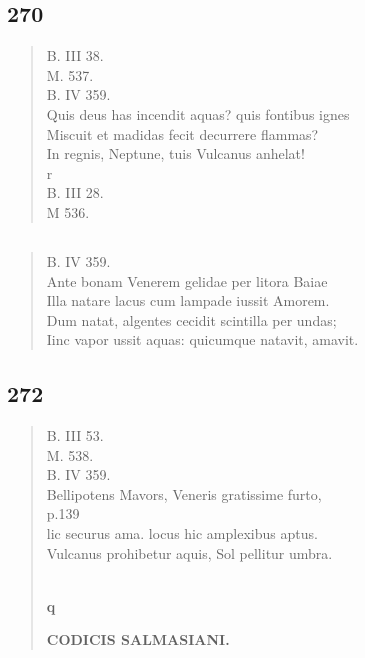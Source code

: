 \documentclass[11pt, a4paper]{report}
\begin{document}
            \subsection*{270}
      \begin{verse}
      B. III 38. \\ M. 537. \\ B. IV 359. \\ Quis deus has incendit aquas? quis fontibus ignes \\ Miscuit et madidas fecit decurrere flammas? \\ In regnis, Neptune, tuis Vulcanus anhelat! \\ r \\ B. III 28. \\ M 536. \\ 
      \end{verse}
  
            \subsection*{}
      \begin{verse}
      B. IV 359. \\ Ante bonam Venerem gelidae per litora Baiae \\ Illa natare lacus cum lampade iussit Amorem. \\ Dum natat, algentes cecidit scintilla per undas; \\ Iinc vapor ussit aquas: quicumque natavit, amavit. \\ 
      \end{verse}
  
            \subsection*{272}
      \begin{verse}
      B. III 53. \\ M. 538. \\ B. IV 359. \\ Bellipotens Mavors, Veneris gratissime furto, \\ p.139 \\ lic securus ama. locus hic amplexibus aptus. \\ Vulcanus prohibetur aquis, Sol pellitur umbra. \\ 
        ﻿\pagebreak 
    \begin{center} \textbf{q} \end{center}\begin{center} \textbf{CODICIS SALMASIANI.} \end{center}
      \end{verse}
  
\end{document}
